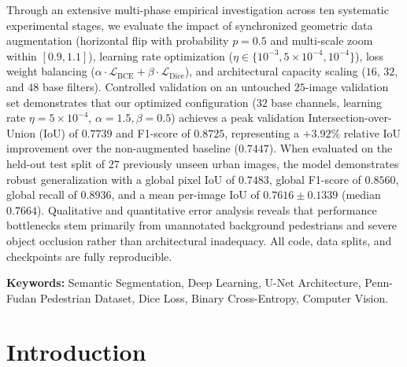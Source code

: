 \documentclass[10pt,a4paper]{report}
\begin{document}
Through an extensive multi-phase empirical investigation across ten systematic experimental stages, we evaluate the impact of synchronized geometric data augmentation (horizontal flip with probability $p=0.5$ and multi-scale zoom within $[0.9, 1.1]$), learning rate optimization ($\eta \in \{10^{-3}, 5\times 10^{-4}, 10^{-4}\}$), loss weight balancing ($\alpha \cdot \mathcal{L}_{\text{BCE}} + \beta \cdot \mathcal{L}_{\text{Dice}}$), and architectural capacity scaling ($16$, $32$, and $48$ base filters). Controlled validation on an untouched $25$-image validation set demonstrates that our optimized configuration ($32$ base channels, learning rate $\eta = 5 \times 10^{-4}$, $\alpha = 1.5, \beta = 0.5$) achieves a peak validation Intersection-over-Union (IoU) of $\mathbf{0.7739}$ and F1-score of $\mathbf{0.8725}$, representing a $+3.92\%$ relative IoU improvement over the non-augmented baseline ($0.7447$). When evaluated on the held-out test split of $27$ previously unseen urban images, the model demonstrates robust generalization with a global pixel IoU of $\mathbf{0.7483}$, global F1-score of $\mathbf{0.8560}$, global recall of $\mathbf{0.8936}$, and a mean per-image IoU of $\mathbf{0.7616} \pm \mathbf{0.1339}$ (median $0.7664$). Qualitative and quantitative error analysis reveals that performance bottlenecks stem primarily from unannotated background pedestrians and severe object occlusion rather than architectural inadequacy. All code, data splits, and checkpoints are fully reproducible.

\vspace{0.4em}
\noindent\textbf{Keywords:} Semantic Segmentation, Deep Learning, U-Net Architecture, Penn-Fudan Pedestrian Dataset, Dice Loss, Binary Cross-Entropy, Computer Vision.

\vspace{0.8cm}
\tableofcontents
\vspace{0.4cm}
\listoffigures
\vspace{0.4cm}
\listoftables
\newpage

\setcounter{page}{1}

\chapter{Introduction}
\label{chap:introduction}
\end{document}
